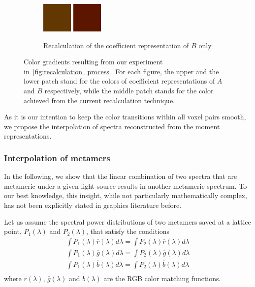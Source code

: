\begin{figure}[t!]
\begin{subfigure}{0.30\textwidth}
		\includegraphics[width=1\linewidth,height=4em]{img/recalculation_color_fitRed.png}
		\includegraphics[width=1\linewidth,height=4em]{img/recalculation_color_red.png}
		\caption{Recalculation of the coefficient representation of $B$ only}
		\label{fig:recalculation_colorGradients_red}
	\end{subfigure}
	\caption{Color gradients resulting from our experiment in~\cref{fig:recalculation_process}. For each figure, the upper and the lower patch stand for the colors of coefficient representations of $A$ and $B$ respectively, while the middle patch stands for the color achieved from the current recalculation technique.}
	\label{fig:recalculation_colorGradients}
\end{figure}

As it is our intention to keep the color transitions within all voxel pairs smooth, we propose the interpolation of spectra reconstructed from the moment representations.

\subsubsection{Interpolation of metamers}
\label{sect:ims}
In the following, we show that the linear combination of two spectra that are metameric under a given light source results in another metameric spectrum. To our best knowledge, this insight, while not particularly mathematically complex, has not been explicitly stated in graphics literature before.

Let us assume the spectral power distributions of two metamers saved at a lattice point, $P_1(\lambda)$ and $P_2(\lambda)$, that satisfy the conditions
\begin{equation} 
\begin{aligned}
\int P_1(\lambda)\overline{r}(\lambda)d\lambda=\int P_2(\lambda)\overline{r}(\lambda)d\lambda\\
\int P_1(\lambda)\overline{g}(\lambda)d\lambda=\int P_2(\lambda)\overline{g}(\lambda)d\lambda\\
\int P_1(\lambda)\overline{b}(\lambda)d\lambda=\int P_2(\lambda)\overline{b}(\lambda)d\lambda\\
\end{aligned}
\label{equation:metamers}
\end{equation}
where $\overline{r}(\lambda)$, $\overline{g}(\lambda)$ and $\overline{b}(\lambda)$ are the RGB color matching functions.

